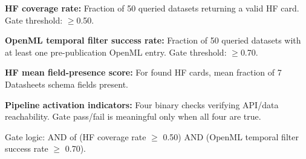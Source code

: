 \textbf{HF coverage rate:} Fraction of 50 queried datasets returning a valid HF card. Gate threshold: $\geq$0.50.

\textbf{OpenML temporal filter success rate:} Fraction of 50 queried datasets with at least one pre-publication OpenML entry. Gate threshold: $\geq$0.70.

\textbf{HF mean field-presence score:} For found HF cards, mean fraction of 7 Datasheets schema fields present.

\textbf{Pipeline activation indicators:} Four binary checks verifying API/data reachability. Gate pass/fail is meaningful only when all four are true.

Gate logic: AND of (HF coverage rate $\geq$ 0.50) AND (OpenML temporal filter success rate $\geq$ 0.70).
